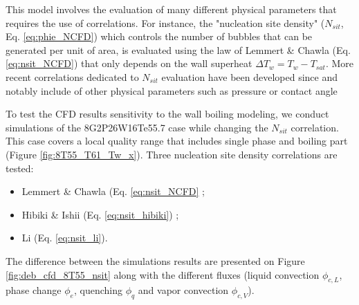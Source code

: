 \npar

This model involves the evaluation of many different physical parameters that requires the use of correlations. For instance, the "nucleation site density" ($N_{sit}$, Eq. \ref{eq:phie_NCFD}) which controls the number of bubbles that can be generated per unit of area, is evaluated using the law of Lemmert \& Chawla \cite{lemmert_influence_1977} (Eq. \ref{eq:nsit_NCFD}) that only depends on the wall superheat $\Delta T_{w} = T_{w}-T_{sat}$. More recent correlations dedicated to $N_{sit}$ evaluation have been developed since and notably include of other physical parameters such as pressure or contact angle \cite{hibiki_active_2003, li_development_2018, zhou_experimental_2020, basu_wall_2005}

\npar

To test the CFD results sensitivity to the wall boiling modeling, we conduct simulations of the 8G2P26W16Te55.7 case while changing the $N_{sit}$ correlation. This case covers a local quality range that includes single phase and boiling part (Figure \ref{fig:8T55_T61_Tw_x}). Three nucleation site density correlations are tested:

\begin{itemize}
\item Lemmert \& Chawla \cite{lemmert_influence_1977} (Eq. \ref{eq:nsit_NCFD} ;
\item Hibiki \& Ishii \cite{hibiki_active_2003} (Eq. \ref{eq:nsit_hibiki}) ;
\item Li \etal \cite{li_development_2018} (Eq. \ref{eq:nsit_li}).
\end{itemize}

The difference between the simulations results are presented on Figure \ref{fig:deb_cfd_8T55_nsit} along with the different fluxes (liquid convection $\phi_{c,L}$, phase change $\phi_{e}$, quenching $\phi_{q}$ and vapor convection $\phi_{c,V}$). 


